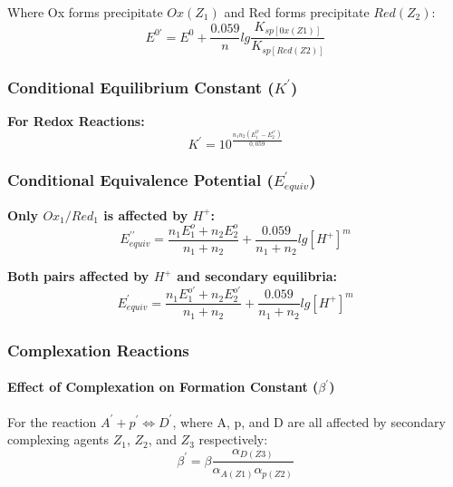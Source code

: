 Where Ox forms precipitate $Ox(Z_1)$ and Red forms precipitate $Red(Z_2)$:
\begin{equation}
E^{0\prime}=E^{0}+\frac{0.059}{n}lg\frac{K_{sp[0x(Z1)]}}{K_{sp[Red(Z2)]}}
\end{equation}


\subsubsection*{Conditional Equilibrium Constant ($K^{\prime}$)}

\textbf{For Redox Reactions:}
\begin{equation}
K^{\prime}=10^{\frac{n_{1}n_{2}(E_{1}^{0\prime}-E_{2}^{o\prime})}{0,059}}
\end{equation}


\subsubsection*{Conditional Equivalence Potential ($E_{equiv}^{\prime}$)}

\textbf{Only $Ox_{1}/Red_{1}$ is affected by $H^{+}$:}
\begin{equation}
E_{equiv}^{\prime\prime}=\frac{n_{1}E_{1}^{o}+n_{2}E_{2}^{o}}{n_{1}+n_{2}}+\frac{0.059}{n_{1}+n_{2}}lg[H^{+}]^{m}
\end{equation}


\textbf{Both pairs affected by $H^{+}$ and secondary equilibria:}
\begin{equation}
E_{equiv}^{\prime}=\frac{n_{1}E_{1}^{o\prime}+n_{2}E_{2}^{o\prime}}{n_{1}+n_{2}}+\frac{0.059}{n_{1}+n_{2}}lg[H^{+}]^{m}
\end{equation}

\subsubsection*{Complexation Reactions}

\paragraph*{Effect of Complexation on Formation Constant ($\beta^{\prime}$)}

For the reaction $A^{\prime}+p^{\prime}\Leftrightarrow D^{\prime}$, where A, p, and D are all affected by secondary complexing agents $Z_1$, $Z_2$, and $Z_3$ respectively:
\begin{equation}
\beta^{\prime}=\beta\frac{\alpha_{D(Z3)}}{\alpha_{A(Z1)}\alpha_{p(Z2)}}
\end{equation}


